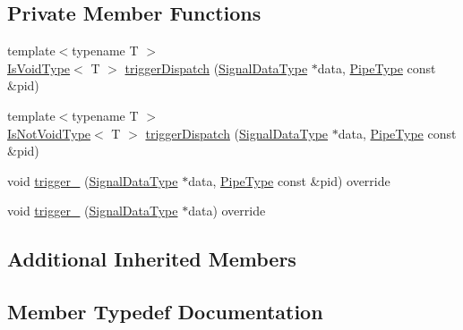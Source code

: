 \subsection*{Private Member Functions}
\begin{DoxyCompactItemize}
\item 
{\footnotesize template$<$typename T $>$ }\\\hyperlink{structvt_1_1pipe_1_1callback_1_1_callback_anon_a3aa19d4a1044d57ba4af22015331c20a}{Is\+Void\+Type}$<$ T $>$ \hyperlink{structvt_1_1pipe_1_1callback_1_1_callback_anon_a71cd1781a5f639ddf5e2aac775c1d397}{trigger\+Dispatch} (\hyperlink{structvt_1_1pipe_1_1callback_1_1_callback_anon_ac503b95feb44bb0b60c1d69e1ed29074}{Signal\+Data\+Type} $\ast$data, \hyperlink{namespacevt_ac9852acda74d1896f48f406cd72c7bd3}{Pipe\+Type} const \&pid)
\item 
{\footnotesize template$<$typename T $>$ }\\\hyperlink{structvt_1_1pipe_1_1callback_1_1_callback_anon_a91e58fe2f8165c826cecedde7e4535cf}{Is\+Not\+Void\+Type}$<$ T $>$ \hyperlink{structvt_1_1pipe_1_1callback_1_1_callback_anon_a394463dec0c5e2dd0a96f7f8b6d6cfae}{trigger\+Dispatch} (\hyperlink{structvt_1_1pipe_1_1callback_1_1_callback_anon_ac503b95feb44bb0b60c1d69e1ed29074}{Signal\+Data\+Type} $\ast$data, \hyperlink{namespacevt_ac9852acda74d1896f48f406cd72c7bd3}{Pipe\+Type} const \&pid)
\item 
void \hyperlink{structvt_1_1pipe_1_1callback_1_1_callback_anon_a15cae5134e53d426110f357bb05fed3c}{trigger\+\_\+} (\hyperlink{structvt_1_1pipe_1_1callback_1_1_callback_anon_ac503b95feb44bb0b60c1d69e1ed29074}{Signal\+Data\+Type} $\ast$data, \hyperlink{namespacevt_ac9852acda74d1896f48f406cd72c7bd3}{Pipe\+Type} const \&pid) override
\item 
void \hyperlink{structvt_1_1pipe_1_1callback_1_1_callback_anon_aa94691cc38d84194b66f5bbb30f43686}{trigger\+\_\+} (\hyperlink{structvt_1_1pipe_1_1callback_1_1_callback_anon_ac503b95feb44bb0b60c1d69e1ed29074}{Signal\+Data\+Type} $\ast$data) override
\end{DoxyCompactItemize}
\subsection*{Additional Inherited Members}


\subsection{Member Typedef Documentation}
\mbox{\label{structvt_1_1pipe_1_1callback_1_1_callback_anon_a2532c5d78c1fb298d4a369aae7b45e85}} 
